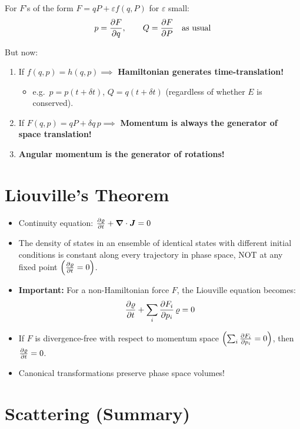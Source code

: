 For $F$'s of the form $F = qP + \varepsilon f(q,P)$ for $\varepsilon$ small:
\[
    p = \pdv{F}{q},\qquad Q = \pdv{F}{P}\quad\text{as usual}
\]

But now:
\begin{enumerate}
    \item If $f(q,p) = h(q,p) \implies$ \textbf{Hamiltonian generates time-translation!}
    \begin{itemize}
        \item e.g.\ $p = p(t+\delta t)$, $Q = q(t+\delta t)$ (regardless of whether $E$ is conserved).
    \end{itemize}
    \item If $F(q,p) = qP + \delta q\,p \implies$ \textbf{Momentum is always the generator of space translation!}
    \item \textbf{Angular momentum is the generator of rotations!}
\end{enumerate}

\section{Liouville's Theorem}

\begin{itemize}
    \item Continuity equation: $\pdv{\varrho}{t} + \grad\cdot\vect{J} = 0$
    \item The density of states in an ensemble of identical states with different initial conditions is constant along every trajectory in phase space, NOT at any fixed point $\left(\pdv{\varrho}{t} = 0\right)$.
    \item \textbf{Important:} For a non-Hamiltonian force $F$, the Liouville equation becomes:
    \[
        \pdv{\varrho}{t} + \sum_i\pdv{F_i}{p_i}\,\varrho = 0
    \]
    \item If $F$ is divergence-free with respect to momentum space $\left(\sum_i\pdv{F_i}{p_i} = 0\right)$, then $\pdv{\varrho}{t} = 0$.
    \item Canonical transformations preserve phase space volumes!
\end{itemize}

\section{Scattering (Summary)}

